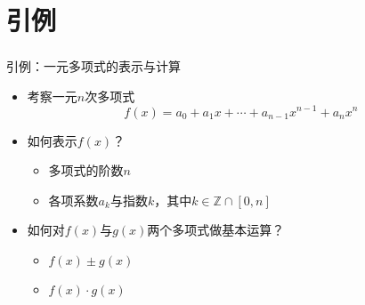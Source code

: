\section{引例}

\begin{frame}
    \frametitle{\insertsectionhead}
    \begin{exampleblock}{引例：一元多项式的表示与计算}
        \begin{itemize}
            \item 考察一元$n$次多项式
                \[
                    f(x) = a_{0} + a_{1}x + \cdots + a_{n-1}x^{n-1} + a_{n}x^{n}
                \]
            \item 如何表示$f(x)$？
            \begin{itemize}
                \item 多项式的阶数$n$
                \item 各项系数$a_{k}$与指数$k$，其中$k\in\mathbb{Z}\cap[0,n]$
            \end{itemize}
            \item 如何对$f(x)$与$g(x)$两个多项式做基本运算？
            \begin{itemize}
                \item $f(x) \pm g(x)$
                \item $f(x) \cdot g(x)$
            \end{itemize}
        \end{itemize}
    \end{exampleblock}
\end{frame}

